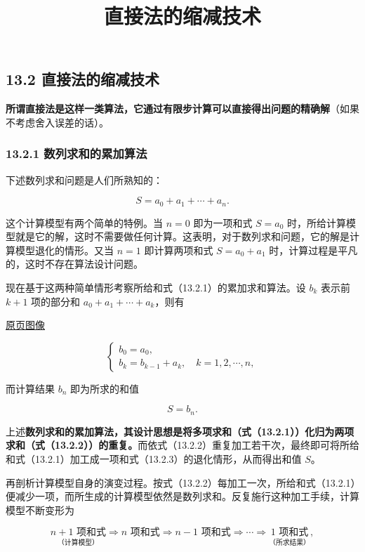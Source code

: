 \documentclass[
  10pt,
  fontset=fandol]{ctexart}
\title{直接法的缩减技术}
\author{}
\date{}
\begin{document}
\maketitle

\subsection{13.2 直接法的缩减技术}\label{ux76f4ux63a5ux6cd5ux7684ux7f29ux51cfux6280ux672f}

\textbf{所谓直接法是这样一类算法，它通过有限步计算可以直接得出问题的精确解}（如果不考虑舍入误差的话）。

\subsubsection{13.2.1 数列求和的累加算法}\label{ux6570ux5217ux6c42ux548cux7684ux7d2fux52a0ux7b97ux6cd5}

下述数列求和问题是人们所熟知的：

\[
S=a_0+a_1+\cdots+a_n.
\tag{13.2.1}
\]

这个计算模型有两个简单的特例。当 \(n=0\) 即为一项和式 \(S=a_0\) 时，所给计算模型就是它的解，这时不需要做任何计算。这表明，对于数列求和问题，它的解是计算模型退化的情形。又当 \(n=1\) 即计算两项和式 \(S=a_0+a_1\) 时，计算过程是平凡的，这时不存在算法设计问题。

现在基于这两种简单情形考察所给和式（13.2.1）的累加求和算法。设 \(b_k\) 表示前 \(k+1\) 项的部分和 \(a_0+a_1+\cdots+a_k\)，则有

\href{../../source-images/pdf-309.jpeg}{原页图像}

\[
\begin{cases}
b_0=a_0,\\
b_k=b_{k-1}+a_k,\quad k=1,2,\cdots,n,
\end{cases}
\tag{13.2.2}
\]

而计算结果 \(b_n\) 即为所求的和值

\[
S=b_n.
\tag{13.2.3}
\]

上述\textbf{数列求和的累加算法，其设计思想是将多项求和（式（13.2.1））化归为两项求和（式（13.2.2））的重复。}而依式（13.2.2）重复加工若干次，最终即可将所给和式（13.2.1）加工成一项和式（13.2.3）的退化情形，从而得出和值 \(S\)。

再剖析计算模型自身的演变过程。按式（13.2.2）每加工一次，所给和式（13.2.1）便减少一项，而所生成的计算模型依然是数列求和。反复施行这种加工手续，计算模型不断变形为

\[
\underset{\text{（计算模型）}}{n+1\text{ 项和式}}
\Rightarrow n\text{ 项和式}
\Rightarrow n-1\text{ 项和式}
\Rightarrow\cdots\Rightarrow
\underset{\text{（所求结果）}}{1\text{ 项和式}},
\]
\end{document}
